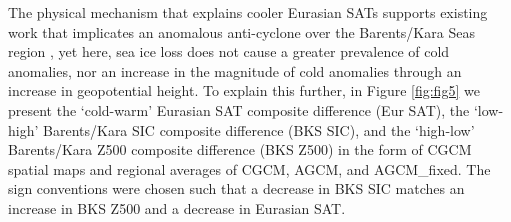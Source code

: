 \documentclass{nature}
\begin{document}

The physical mechanism that explains cooler Eurasian SATs supports existing work that implicates an anomalous anti-cyclone over the Barents/Kara Seas region \cite{honda09,petoukhov10,mori14}, yet here, sea ice loss does not cause a greater prevalence of cold anomalies, nor an increase in the magnitude of cold anomalies through an increase in geopotential height. To explain this further, in Figure \ref{fig:fig5} we present the `cold-warm' Eurasian SAT composite difference (Eur SAT), the `low-high' Barents/Kara SIC composite difference (BKS SIC), and the `high-low' Barents/Kara Z500 composite difference (BKS Z500) in the form of CGCM spatial maps and regional averages of CGCM, AGCM, and AGCM\_fixed. The sign conventions were chosen such that a decrease in BKS SIC matches an increase in BKS Z500 and a decrease in Eurasian SAT.
\end{document}
